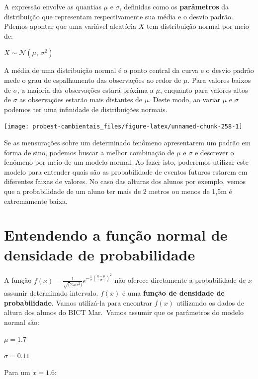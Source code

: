 \documentclass[
]{book}
\begin{document}
A expressão envolve as quantias \(\mu\) e \(\sigma\), definidas como os \textbf{parâmetros} da distribuição que representam respectivamente sua média e o desvio padrão. Pdemos apontar que uma variável aleatória \(X\) tem distribuição normal por meio de:

\(X \sim \mathcal{N}(\mu,\,\sigma^2)\)

A média de uma distribuição normal é o ponto central da curva e o desvio padrão mede o grau de espalhamento das observações ao redor de \(\mu\). Para valores baixos de \(\sigma\), a maioria das observações estará próxima a \(\mu\), enquanto para valores altos de \(\sigma\) as observações estarão mais distantes de \(\mu\). Deste modo, ao variar \(\mu\) e \(\sigma\) podemos ter uma infinidade de distribuições normais.

\begin{center}\texttt{[image: probest-cambientais\_files/figure-latex/unnamed-chunk-258-1]} \end{center}

Se as mensurações sobre um determinado fenômeno apresentarem um padrão em forma de sino, podemos buscar a melhor combinação de \(\mu\) e \(\sigma\) e descrever o fenômeno por meio de um modelo normal. Ao fazer isto, poderemos utilizar este modelo para entender quais são as probabilidade de eventos futuros estarem em diferentes faixas de valores. No caso das alturas dos alunos por exemplo, vemos que a probabilidade de um aluno ter mais de 2 metros ou menos de 1,5m é extremamente baixa.

\hypertarget{entendendo-a-funuxe7uxe3o-normal-de-densidade-de-probabilidade}{%
\section{Entendendo a função normal de densidade de probabilidade}\label{entendendo-a-funuxe7uxe3o-normal-de-densidade-de-probabilidade}}

A função \(f(x) = \frac{1}{\sqrt(2\pi\sigma^2)}e^{-\frac{1}{2}(\frac{y-\mu}{\sigma})^2}\) não oferece diretamente a probabilidade de \(x\) assumir determinado intervalo. \(f(x)\) é uma \textbf{função de densidade de probabilidade}. Vamos utilizá-la para encontrar \(f(x)\) utilizando os dados de altura dos alunos do BICT Mar.~Vamos assumir que os parâmetros do modelo normal são:

\(\mu = 1.7\)

\(\sigma = 0.11\)

Para um \(x = 1.6\):
\end{document}
